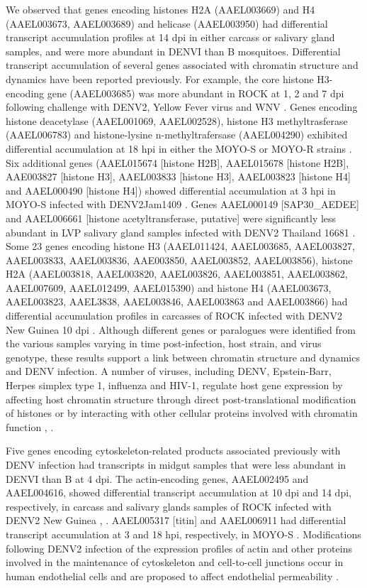We observed that genes encoding histones H2A (AAEL003669) and H4 (AAEL003673, AAEL003689) and helicase (AAEL003950) had differential transcript accumulation profiles at 14 dpi in either carcass or salivary gland samples, and were more abundant in DENVI than B mosquitoes.
Differential transcript accumulation of several genes associated with chromatin structure and dynamics have been reported previously.
For example, the core histone H3-encoding gene (AAEL003685) was more abundant in ROCK at 1, 2 and 7 dpi following challenge with DENV2, Yellow Fever virus and WNV \cite{Colpitts2011}.
Genes encoding histone deacetylase (AAEL001069, AAEL002528), histone H3 methyltrasferase (AAEL006783) and histone-lysine n-methyltrafersase (AAEL004290) exhibited differential accumulation at 18 hpi in either the MOYO-S or MOYO-R strains \cite{Behura2011}.
Six additional genes (AAEL015674 [histone H2B], AAEL015678 [histone H2B], AAE003827 [histone H3], AAEL003833 [histone H3], AAEL003823 [histone H4] and AAEL000490 [histone H4]) showed differential accumulation at 3 hpi in MOYO-S infected with DENV2Jam1409 \cite{Behura2011}.
Genes AAEL000149 [SAP30\_AEDEE] and AAEL006661 [histone acetyltransferase, putative] were significantly less abundant in LVP salivary gland samples infected with DENV2 Thailand 16681 \cite{Luplertlop2011}.
Some 23 genes encoding histone H3 (AAEL011424, AAEL003685, AAEL003827, AAEL003833, AAEL003836, AAE003850, AAEL003852, AAEL003856), histone H2A (AAEL003818, AAEL003820, AAEL003826, AAEL003851, AAEL003862, AAEL007609, AAEL012499, AAEL015390) and histone H4 (AAEL003673, AAEL003823, AAEL3838, AAEL003846, AAEL003863 and AAEL003866) had differential accumulation profiles in carcasses of ROCK infected with DENV2 New Guinea 10 dpi \cite{Xi2008}.
Although different genes or paralogues were identified from the various samples varying in time post-infection, host strain, and virus genotype, these results support a link between chromatin structure and dynamics and DENV infection.
A number of viruses, including DENV, Epstein-Barr, Herpes simplex type 1, influenza and HIV-1, regulate host gene expression by affecting host chromatin structure through direct post-translational modification of histones or by interacting with other cellular proteins involved with chromatin function \cite{Colpitts2011}, \cite{Kent2004}\cite{Wei}\cite{Chase2011}\cite{Creaven1999}.

Five genes encoding cytoskeleton-related products associated previously with DENV infection had transcripts in midgut samples that were less abundant in DENVI than B at 4 dpi.
The actin-encoding genes, AAEL002495 and AAEL004616, showed differential transcript accumulation at 10 dpi and 14 dpi, respectively, in carcass and salivary glands samples of ROCK infected with DENV2 New Guinea \cite{Xi2008}, \cite{Sim2012}.
AAEL005317 [titin] and AAEL006911 had differential transcript accumulation at 3 and 18 hpi, respectively, in MOYO-S \cite{Behura2011}.
Modifications following DENV2 infection of the expression profiles of actin and other proteins involved in the maintenance of cytoskeleton and cell-to-cell junctions occur in human endothelial cells and are proposed to affect endothelial permeability \cite{Kanlaya2009}.

